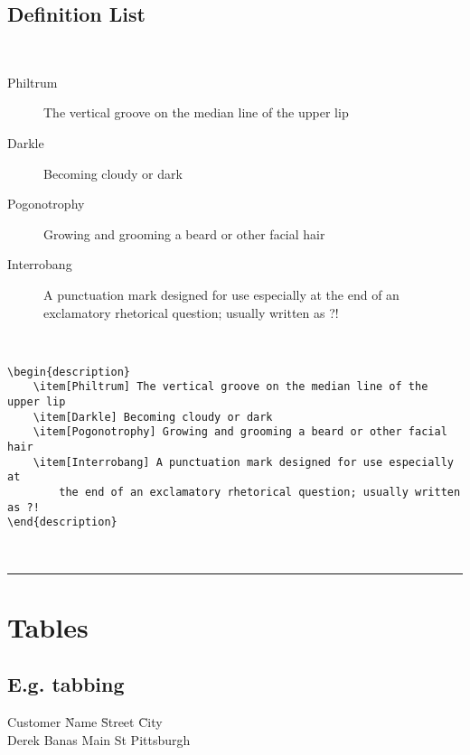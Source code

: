 \documentclass[a4paper,12pt,titlepage]{article}
\begin{document}
\subsection{Definition List}\hspace*{\fill}
\\
\begin{description}
	\item[Philtrum] The vertical groove on the median line of the upper lip
	\item[Darkle] Becoming cloudy or dark
	\item[Pogonotrophy] Growing and grooming a beard or other facial hair
	\item[Interrobang] A punctuation mark designed for use especially at the end of an exclamatory rhetorical question; usually written as ?!
\end{description}
~\\
\begin{minipage}{\linewidth}
\begin{lstlisting}
\begin{description}
	\item[Philtrum] The vertical groove on the median line of the upper lip
	\item[Darkle] Becoming cloudy or dark
	\item[Pogonotrophy] Growing and grooming a beard or other facial hair
	\item[Interrobang] A punctuation mark designed for use especially at 
		the end of an exclamatory rhetorical question; usually written as ?!
\end{description}
\end{lstlisting}
\end{minipage}
~\\
\rule{\linewidth}{0.1mm}



\section{Tables}
\subsection{E.g. tabbing}
\begin{tabbing}

Customer  \= Name \hspace*{1.5cm} \= Street \hspace*{1.5cm} \= City \\

\> Derek Banas  Main St \> Pittsburgh \\
\end{tabbing}
\end{document}
